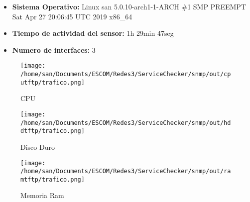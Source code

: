 \begin{itemize}
\item \textbf{Sistema Operativo:}  Linux san 5.0.10-arch1-1-ARCH \#1 SMP PREEMPT Sat Apr 27 20:06:45 UTC 2019 x86\_64
\item \textbf{Tiempo de actividad del sensor:} 1h 29min 47seg
\item \textbf{Numero de interfaces:} 3
\end{itemize}
\begin{figure}[!htb]
\texttt{[image: /home/san/Documents/ESCOM/Redes3/ServiceChecker/snmp/out/cputftp/trafico.png]}
\caption{CPU}\label{fig:awesome_image1}
\endminipage\hfill
{}
\texttt{[image: /home/san/Documents/ESCOM/Redes3/ServiceChecker/snmp/out/hddtftp/trafico.png]}
\caption{Disco Duro}\label{fig:awesome_image2}
\endminipage\hfill
{}%
\texttt{[image: /home/san/Documents/ESCOM/Redes3/ServiceChecker/snmp/out/ramtftp/trafico.png]}
\caption{Memoria Ram}\label{fig:awesome_image3}
\endminipage
\end{figure}
\FloatBarrier
